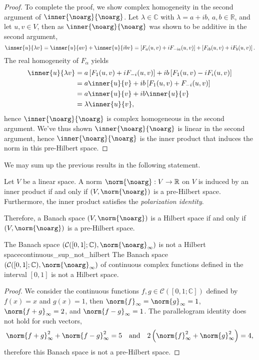\begin{proof}
    To complete the proof, we show complex homogeneity in the second argument of \(\inner{\noarg}{\noarg}\). Let \(\lambda \in \mathbb{C}\) with \(\lambda = a + ib\), \(a,b \in \mathbb{R}\), and let \(u, v \in V\), then as \(\inner{\noarg}{\noarg}\) was shown to be additive in the second argument,
    \begin{equation*}
        \inner{u}{\lambda v} = \inner{u}{av} + \inner{u}{ibv} = \left[F_a(u,v) + iF_{-ia}(u,v)\right] + \left[F_{ib}(u,v) + iF_{b}(u,v)\right].
    \end{equation*}
    The real homogeneity of \(F_{\alpha}\) yields
    \begin{align*}
        \inner{u}{\lambda v} &= a\left[F_1(u,v) + iF_{-i}(u,v)\right] + ib\left[F_{1}(u,v)-iF_{i}(u,v)\right]\\
                             &= a\inner{u}{v} + ib\left[F_{1}(u,v) + F_{-i}(u,v)\right]\\
                             &= a\inner{u}{v} + ib \inner{u}{v}\\
                             &= \lambda \inner{u}{v},
    \end{align*}
    hence \(\inner{\noarg}{\noarg}\) is complex homogeneous in the second argument. We've thus shown \(\inner{\noarg}{\noarg}\) is linear in the second argument, hence \(\inner{\noarg}{\noarg}\) is the inner product that induces the norm in this pre-Hilbert space.
\end{proof}

We may sum up the previous results in the following statement.
\begin{corollary}
    Let \(V\) be a linear space. A norm \(\norm{\noarg} : V \to \mathbb{R}\) on \(V\) is induced by an inner product if and only if \((V, \norm{\noarg})\) is a pre-Hilbert space. Furthermore, the inner product satisfies the \emph{polarization identity}.
\end{corollary}

Therefore, a Banach space \((V, \norm{\noarg})\) is a Hilbert space if and only if \((V, \norm{\noarg})\) is a pre-Hilbert space.
\begin{example}{The Banach space \((\mathcal{C}([0,1];\mathbb{C}), \norm{\noarg}_\infty)\) is not a Hilbert space}{continuous_sup_not_hilbert}
    The Banach space \((\mathcal{C}([0,1];\mathbb{C}), \norm{\noarg}_\infty)\) of continuous complex functions defined in the interval \([0,1]\) is not a Hilbert space.
\end{example}
\begin{proof}
    We consider the continuous functions \(f,g \in \mathcal{C}([0,1;\mathbb{C}])\) defined by \(f(x) = x\) and \(g(x) = 1\), then \(\norm{f}_\infty = \norm{g}_\infty = 1\), \(\norm{f + g}_\infty = 2\), and \(\norm{f - g}_\infty = 1\). The parallelogram identity does not hold for such vectors,
    \begin{equation*}
        \norm{f+g}_\infty^2 + \norm{f-g}_\infty^2 = 5\quad\text{and}\quad2\left(\norm{f}_\infty^2 + \norm{g}_\infty^2\right) = 4,
    \end{equation*}
    therefore this Banach space is not a pre-Hilbert space.
\end{proof}

